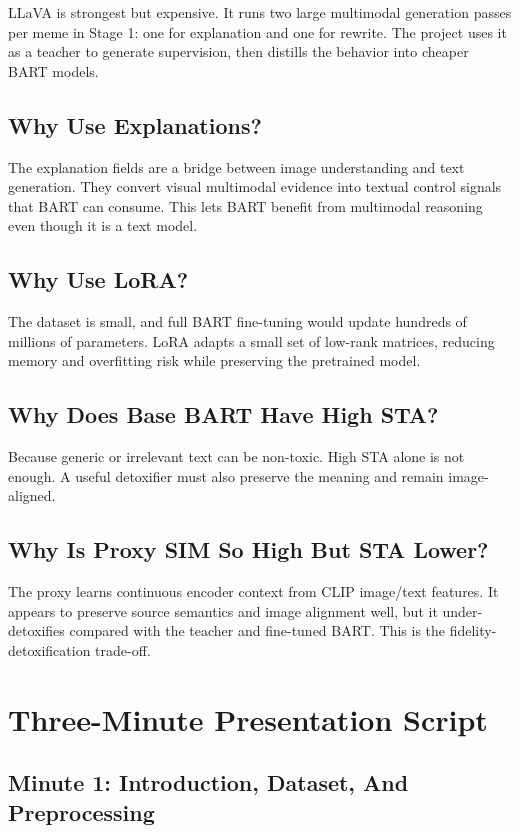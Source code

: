 \documentclass[11pt,a4paper]{article}
\begin{document}
LLaVA is strongest but expensive. It runs two large multimodal generation passes per meme in Stage 1: one for explanation and one for rewrite. The project uses it as a teacher to generate supervision, then distills the behavior into cheaper BART models.

\subsection{Why Use Explanations?}

The explanation fields are a bridge between image understanding and text generation. They convert visual multimodal evidence into textual control signals that BART can consume. This lets BART benefit from multimodal reasoning even though it is a text model.

\subsection{Why Use LoRA?}

The dataset is small, and full BART fine-tuning would update hundreds of millions of parameters. LoRA adapts a small set of low-rank matrices, reducing memory and overfitting risk while preserving the pretrained model.

\subsection{Why Does Base BART Have High STA?}

Because generic or irrelevant text can be non-toxic. High STA alone is not enough. A useful detoxifier must also preserve the meaning and remain image-aligned.

\subsection{Why Is Proxy SIM So High But STA Lower?}

The proxy learns continuous encoder context from CLIP image/text features. It appears to preserve source semantics and image alignment well, but it under-detoxifies compared with the teacher and fine-tuned BART. This is the fidelity-detoxification trade-off.

\section{Three-Minute Presentation Script}

\subsection*{Minute 1: Introduction, Dataset, And Preprocessing}
\end{document}
